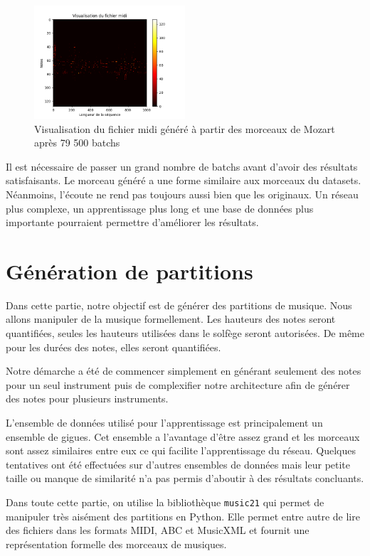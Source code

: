 \begin{figure}[!h]
  \centering
  \includegraphics[width=0.5\textwidth]{images/chapter9/midi_generated_mozart_79500.png}
  \caption{Visualisation du fichier midi généré à partir des morceaux de Mozart après 79 500 batchs}
  \label{midi_generated_mozart}
\end{figure}

Il est nécessaire de passer un grand nombre de batchs avant d'avoir des résultats satisfaisants. Le morceau généré a une forme similaire aux morceaux du datasets. Néanmoins, l'écoute ne rend pas toujours aussi bien que les originaux. Un réseau plus complexe, un apprentissage plus long et une base de données plus importante pourraient permettre d'améliorer les résultats.


\section{Génération de partitions}

Dans cette partie, notre objectif est de générer des partitions de musique. Nous allons manipuler de la musique formellement. Les hauteurs des notes seront quantifiées, seules les hauteurs utilisées dans le solfège seront autorisées. De même pour les durées des notes, elles seront quantifiées.

Notre démarche a été de commencer simplement en générant seulement des notes pour un seul instrument puis de complexifier notre architecture afin de générer des notes pour plusieurs instruments.

L'ensemble de données utilisé pour l'apprentissage est principalement un ensemble de gigues. Cet ensemble a l'avantage d'être assez grand et les morceaux sont assez similaires entre eux ce qui facilite l'apprentissage du réseau. Quelques tentatives ont été effectuées sur d'autres ensembles de données mais leur petite taille ou manque de similarité n'a pas permis d'aboutir à des résultats concluants.

Dans toute cette partie, on utilise la bibliothèque \texttt{music21} qui permet de manipuler très aisément des partitions en Python. Elle permet entre autre de lire des fichiers dans les formats MIDI, ABC et MusicXML et fournit une représentation formelle des morceaux de musiques.

